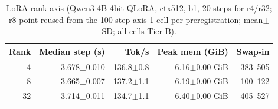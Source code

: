 \begin{table}[t]\centering
\caption{LoRA rank axis (Qwen3-4B-4bit QLoRA, ctx512, b1, 20 steps for r4/r32; r8 point reused from the 100-step axis-1 cell per preregistration; mean$\pm$SD; all cells Tier-B).}
\label{tab:rank}
\footnotesize\setlength{\tabcolsep}{3pt}
\begin{tabular}{rrrrr}
\toprule
Rank & Median step (s) & Tok/s & Peak mem (GiB) & Swap-in\\
\midrule
4 & 3.678$\pm$0.010 & 136.8$\pm$0.8 & 6.16$\pm$0.00 GiB & 383--505\\
8 & 3.665$\pm$0.007 & 137.2$\pm$1.1 & 6.19$\pm$0.00 GiB & 100--122\\
32 & 3.714$\pm$0.011 & 134.7$\pm$1.1 & 6.40$\pm$0.00 GiB & 405--527\\
\bottomrule
\end{tabular}
\end{table}
